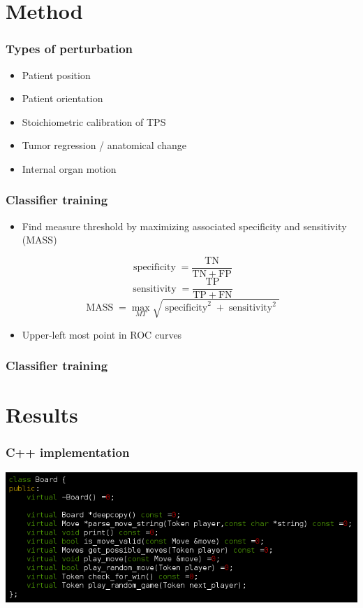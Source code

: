 \documentclass{beamer}
\begin{document}
\section{Method}

\begin{frame}
\frametitle{Types of perturbation}
\begin{itemize}
 \item \alert<2>{Patient position}
 \item Patient orientation
 \item Stoichiometric calibration of TPS
 \item Tumor regression / anatomical change
 \item Internal organ motion
\end{itemize}
\end{frame}

\begin{frame}
\frametitle{Classifier training}
\begin{itemize}
 \item Find measure threshold by maximizing associated specificity and sensitivity (MASS)
\end{itemize}
\vspace*{.5cm}
$$\operatorname{specificity} = \frac{\mathrm{TN}}{\mathrm{TN}+\mathrm{FP}}$$
$$\operatorname{sensitivity} = \frac{\mathrm{TP}}{\mathrm{TP}+\mathrm{FN}}$$
$$\operatorname{MASS} = \max_{MT} \sqrt{\operatorname{specificity}^2 + \operatorname{sensitivity}^2}$$
\begin{itemize}
 \item Upper-left most point in ROC curves
\end{itemize}
\end{frame}

\begin{frame}
\frametitle{Classifier training}
\begin{center}
\end{center}
\end{frame}

\section{Results}

\begin{frame}
\begin{center}
\frametitle{C++ implementation}
\includegraphics[width=\linewidth]{board_virtual}
\end{center}
\end{frame}
\end{document}
